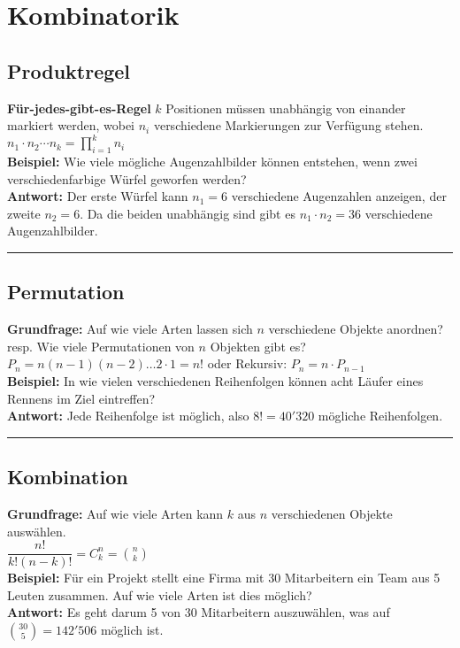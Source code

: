 \section{Kombinatorik}

\subsection{Produktregel}
\textbf{Für-jedes-gibt-es-Regel} $k$ Positionen müssen unabhängig von einander markiert werden, wobei $n_i$ verschiedene Markierungen zur Verfügung stehen.\\[5pt]
$\boxed{n_1 \cdot n_2 \cdots n_k =  \prod_{i=1}^{k} n_i}$\\[5pt]
\textbf{Beispiel:} Wie viele mögliche Augenzahlbilder können entstehen, wenn zwei verschiedenfarbige Würfel geworfen werden?\\
\textbf{Antwort:} Der erste Würfel kann $n_1 = 6$ verschiedene Augenzahlen anzeigen, der zweite $n_2 = 6$. Da die beiden unabhängig sind gibt es $n_1 \cdot n_2 = 36$ verschiedene Augenzahlbilder.

\hrule

\subsection{Permutation}
\textbf{Grundfrage:} Auf wie viele Arten lassen sich $n$ verschiedene Objekte anordnen? resp. Wie viele Permutationen von $n$ Objekten gibt es?\\[5pt]
$\boxed{P_n = n(n-1)(n-2) \dots 2 \cdot 1 = n!}$ \qquad oder Rekursiv: $\boxed{P_n = n \cdot P_{n-1}}$\\[5pt]
\textbf{Beispiel:} In wie vielen verschiedenen Reihenfolgen können acht Läufer eines Rennens im Ziel eintreffen?\\
\textbf{Antwort:} Jede Reihenfolge ist möglich, also $8! = 40'320$ mögliche Reihenfolgen.

\hrule

\subsection{Kombination}
\textbf{Grundfrage:} Auf wie viele Arten kann $k$ aus $n$ verschiedenen Objekte auswählen.\\[5pt]
$ \boxed{\dfrac{n!}{k!(n-k)!} = C^n_k = \binom{n}{k} }$\\[5pt]
\textbf{Beispiel:} Für ein Projekt stellt eine Firma mit 30 Mitarbeitern ein Team aus 5 Leuten zusammen. Auf wie viele Arten ist dies möglich?\\
\textbf{Antwort:} Es geht darum 5 von 30 Mitarbeitern auszuwählen, was auf $\displaystyle \binom{30}{5} = 142'506$ möglich ist.

